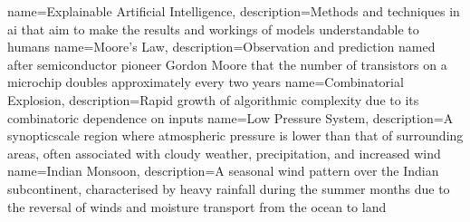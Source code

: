 {
    name=Explainable Artificial Intelligence,
    description={Methods and techniques in \acrfull{ai} that aim to make the results and workings of models understandable to humans}
}
{
    name=Moore's Law,
    description={Observation and prediction named after semiconductor pioneer Gordon Moore that the number of transistors on a microchip doubles approximately every two years}
}
{
    name=Combinatorial Explosion,
    description={Rapid growth of algorithmic complexity due to its combinatoric dependence on inputs}
}
{
    name=Low Pressure System,
    description={A \gls{synopticscale} region where atmospheric pressure is lower than that of surrounding areas, often associated with cloudy weather, precipitation, and increased wind}
}
{
    name=Indian Monsoon,
    description={A seasonal wind pattern over the Indian subcontinent, characterised by heavy rainfall during the summer months due to the reversal of winds and moisture transport from the ocean to land}
}

